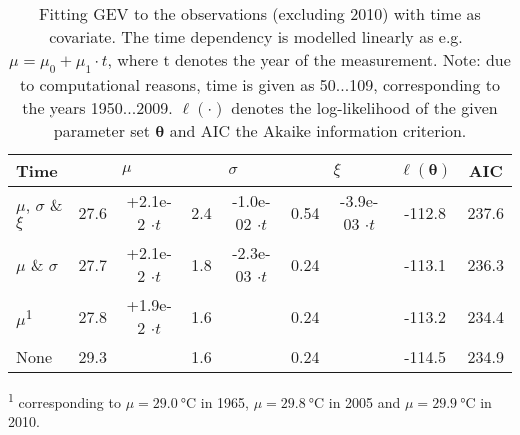 \begin{table}[h!tbc]
\caption{Fitting GEV to the observations (excluding 2010) with time as covariate. 
The time dependency is modelled linearly as e.g.\ $\mu = \mu_0 + \mu_1\cdot t$, where t denotes the year of the measurement.
Note: due to computational reasons, time is given as 50...109, corresponding to the years 1950...2009.
$\ell(\boldsymbol{\cdot})$ denotes the log-likelihood of the given parameter set $\boldsymbol{\theta}$ and AIC the Akaike information criterion.}
{
\centering
\begin{tabular}{l
S[table-format=2.1]@{\,}
S[table-format=+1.1e-1,table-space-text-post=$\cdot t$]
S[table-format=2.1]@{ }
S[table-format=+1.1e-1,table-space-text-post=$\cdot t$]
S[table-format=2.2]@{ }
S[table-format=+1.1e-1,table-space-text-post=$\cdot t$]
S[table-format=-3.1]
S[table-format=3.1]
}
\toprule
Time         &  &  &  & {$\ell(\boldsymbol{\theta})$} & AIC \\
\midrule
$\mu$, $\sigma$ \& $\xi$ & 27.6 & +2.1e-2 $\cdot t$ & 2.4 & -1.0e-02  $\cdot t$  & 0.54 & -3.9e-03 $\cdot t$ & -112.8 & 237.6 \\
$\mu$ \& $\sigma$        & 27.7 & +2.1e-2 $\cdot t$ & 1.8 & -2.3e-03  $\cdot t$  & 0.24 &                    & -113.1 & 236.3 \\
$\mu$\textsuperscript{1} & 27.8 & +1.9e-2 $\cdot t$ & 1.6 &                      & 0.24 &                    & -113.2 & 234.4 \\
None                 & 29.3 &                   & 1.6  &                     & 0.24 &                    & -114.5 & 234.9 \\
\bottomrule
\end{tabular}

} %
\footnotesize{\vspace*{1ex} \textsuperscript{1} corresponding to $\mu=\SI{29.0}{\celsius}$ in 1965, $\mu=\SI{29.8}{\celsius}$ in 2005 and $\mu=\SI{29.9}{\celsius}$ in 2010.}
\end{table}


